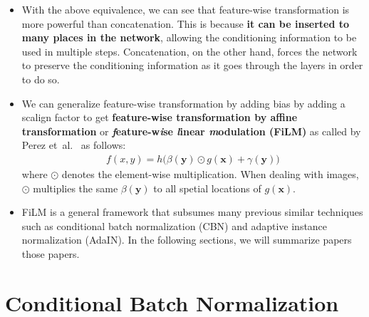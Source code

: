 \documentclass[10pt]{article}
\newcommand{\ve}[1]{\mathbf{#1}}
\newcommand{\etal}{{et~al.}}
\begin{document}
\begin{itemize}
  	\item With the above equivalence, we can see that feature-wise transformation is more powerful than concatenation. This is because \textbf{it can be inserted to many places in the network}, allowing the conditioning information to be used in multiple steps. Concatenation, on the other hand, forces the network to preserve the conditioning information as it goes through the layers in order to do so.

  	\item We can generalize feature-wise transformation by adding bias by adding a scalign factor to get \textbf{feature-wise transformation by affine transformation} or \textbf{\emph{f}eature-w\emph{i}se \emph{l}inear \emph{m}odulation (FiLM)} as called by Perez \etal~\cite{Perez:2017} as follows:
  	\begin{align*}
  		f(x,y) = h\big(\beta(\ve{y}) \odot g(\ve{x}) + \gamma(\ve{y})\big)
  	\end{align*}
  	where $\odot$ denotes the element-wise multiplication. When dealing with images, $\odot$ multiplies the same $\beta(\ve{y})$ to all spetial locations of $g(\ve{x})$.

  	\item FiLM is a general framework that subsumes many previous similar techniques such as conditional batch normalization (CBN) and adaptive instance normalization (AdaIN). In the following sections, we will summarize papers those papers.
  \end{itemize}

  \section{Conditional Batch Normalization}
\end{document}
